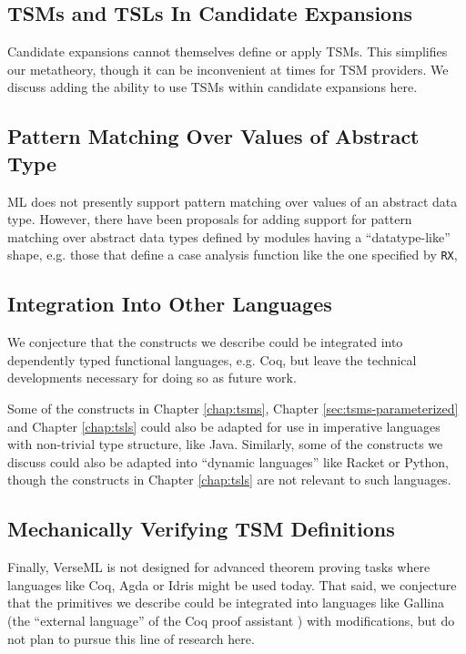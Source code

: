 {\subsection{TSMs and TSLs In Candidate Expansions}\label{sec:tsms-in-expansions}


Candidate expansions cannot themselves define or apply TSMs. This simplifies our metatheory, though it can be inconvenient at times for TSM providers. We discuss adding the ability to use TSMs within candidate expansions here.

\subsection{Pattern Matching Over Values of Abstract Type}\label{sec:patterns-for-abstract-types}
ML does not presently support pattern matching over values of an abstract data type. However, there have been proposals for adding support for pattern matching over abstract data types defined by modules having a ``datatype-like'' shape, e.g. those that define a case analysis function like the one specified by \lstinline{RX}, %


\subsection{Integration Into Other Languages}\label{sec:integration}
We conjecture that the constructs we describe could be integrated into dependently typed functional languages, e.g. Coq, but leave the technical developments necessary for doing so as future work.

Some of the constructs in Chapter \ref{chap:tsms}, Chapter \ref{sec:tsms-parameterized} and Chapter \ref{chap:tsls} could also be adapted for use in imperative languages with non-trivial type structure, like Java. Similarly, some of the constructs we discuss could also be adapted into ``{dynamic languages}'' like Racket or Python, though the constructs in Chapter \ref{chap:tsls} are not relevant to such languages. 


\subsection{Mechanically Verifying TSM Definitions}\label{sec:verifying-tsms}
Finally, VerseML is not designed for advanced theorem proving tasks where languages like Coq, Agda or Idris might be used today. That said, we conjecture that the primitives we describe could be integrated into languages like Gallina (the ``external language'' of the Coq proof assistant  \cite{Coq:manual}) with  modifications, but do not plan to pursue this line of research here.

}
